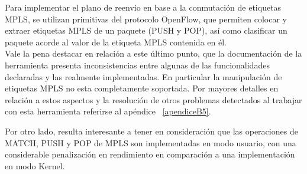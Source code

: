 Para implementar el plano de reenvío en base a la conmutaci\'on de etiquetas MPLS, se utilizan primitivas del protocolo OpenFlow, que permiten colocar y extraer etiquetas MPLS de un paquete (PUSH y POP), así como clasificar un paquete acorde al valor de la etiqueta MPLS contenida en \'el.\\

Vale la pena destacar en relaci\'on a este \'ultimo punto, que la documentaci\'on de la herramienta presenta inconsistencias entre algunas de las funcionalidades declaradas y las realmente implementadas. En particular la manipulaci\'on de etiquetas MPLS no esta completamente soportada. Por mayores detalles en relaci\'on a estos aspectos y la resoluci\'on de otros problemas detectados al trabajar con esta herramienta referirse al ap\'endice ~\ref{apendiceB5}.
 


Por otro lado, resulta interesante a tener en consideraci\'on que las operaciones de MATCH, PUSH y POP de MPLS son implementadas en modo usuario, con una considerable penalizaci\'on en rendimiento en comparaci\'on a una implementaci\'on en modo Kernel.

